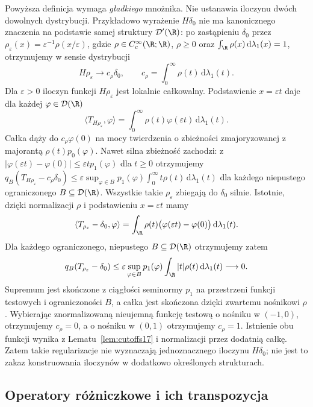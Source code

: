 \begin{uwaga}
\label{rem:no-product20}
Powyższa definicja wymaga \emph{gładkiego} mnożnika.
Nie ustanawia iloczynu dwóch dowolnych dystrybucji.
Przykładowo wyrażenie $H\delta_0$ nie ma kanonicznego
znaczenia na podstawie samej struktury $\mathcal D'(\R)$:
po zastąpieniu $\delta_0$ przez
$\rho_\varepsilon(x)=\varepsilon^{-1}\rho(x/\varepsilon)$,
gdzie $\rho\in C_c^\infty(\R;\R)$, $\rho\ge0$ oraz
$\int_\R\rho(x)\,\mathrm d\lambda_1(x)=1$,
otrzymujemy w sensie dystrybucji
\[
 H\rho_\varepsilon\longrightarrow c_\rho\delta_0,
 \qquad c_\rho=\int_0^\infty\rho(t)\,\mathrm d\lambda_1(t).
\]
Dla $\varepsilon>0$ iloczyn funkcji $H\rho_\varepsilon$
jest lokalnie całkowalny. Podstawienie $x=\varepsilon t$
daje dla każdej $\varphi\in\mathcal D(\R)$
\[
\langle T_{H\rho_\varepsilon},\varphi\rangle
=\int_0^\infty\rho(t)\varphi(\varepsilon t)\,\mathrm d\lambda_1(t).
\]
Całka dąży do $c_\rho\varphi(0)$ na mocy twierdzenia
o zbieżności zmajoryzowanej z majorantą
$\rho(t)p_0(\varphi)$.
Nawet silna zbieżność zachodzi: z
$|\varphi(\varepsilon t)-\varphi(0)|\le\varepsilon t p_1(\varphi)$
dla $t\ge0$ otrzymujemy
$q_B(T_{H\rho_\varepsilon}-c_\rho\delta_0)
\le\varepsilon\sup_{\varphi\in B}p_1(\varphi)
\int_0^\infty t\rho(t)\,\mathrm d\lambda_1(t)$
dla każdego niepustego ograniczonego $B\subseteq\mathcal D(\R)$.
Wszystkie takie $\rho_\varepsilon$ zbiegają do $\delta_0$
silnie. Istotnie, dzięki normalizacji $\rho$ i podstawieniu
$x=\varepsilon t$ mamy
\[
 \langle T_{\rho_\varepsilon}-\delta_0,\varphi\rangle
 =\int_\R \rho(t)\bigl(\varphi(\varepsilon t)-\varphi(0)\bigr)
 \,\mathrm d\lambda_1(t).
\]
Dla każdego ograniczonego, niepustego $B\subseteq\mathcal D(\R)$
otrzymujemy zatem
\[
 q_B(T_{\rho_\varepsilon}-\delta_0)
 \le\varepsilon \sup_{\varphi\in B}p_1(\varphi)
 \int_\R |t|\rho(t)\,\mathrm d\lambda_1(t)
 \longrightarrow 0.
\]
Supremum jest skończone z ciągłości seminormy $p_1$
na przestrzeni funkcji testowych i ograniczoności $B$,
a całka jest skończona dzięki zwartemu nośnikowi $\rho$. Wybierając znormalizowaną nieujemną
funkcję testową o nośniku w $(-1,0)$, otrzymujemy $c_\rho=0$,
a o nośniku w $(0,1)$ otrzymujemy $c_\rho=1$.
Istnienie obu funkcji wynika z Lematu~\ref{lem:cutoffs17}
i normalizacji przez dodatnią całkę.
Zatem takie regularizacje nie wyznaczają jednoznacznego
iloczynu $H\delta_0$; nie jest to zakaz konstruowania
iloczynów w dodatkowo określonych strukturach.
\end{uwaga}

\subsection{Operatory różniczkowe i ich transpozycja}

